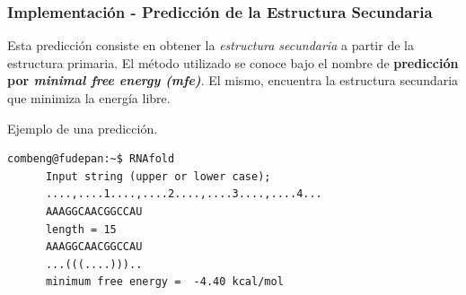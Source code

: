 \documentclass[xcolor=pdftex,dvipsnames,table,10pt,babel,spanish]{beamer}
\begin{document}



\begin {frame}[fragile]
    \frametitle{Implementaci\'on - Predicci\'on de la Estructura Secundaria}
      Esta predicci\'on consiste en obtener la \emph{estructura secundaria} a partir de la estructura primaria. El m\'etodo utilizado se conoce bajo el nombre de \textbf{predicci\'on por \emph{minimal free energy (mfe)}}. El mismo, encuentra la estructura secundaria que minimiza la energ\'ia libre.\\
      \begin{block} {Ejemplo de una predicci\'on.}
      \scriptsize
      \begin{lstlisting}[basicstyle=\tt, frame=trBL, tabsize=4] 
	  combeng@fudepan:~$ RNAfold
	  Input string (upper or lower case); 
	  ....,....1....,....2....,....3....,....4...
	  AAAGGCAACGGCCAU
	  length = 15
	  AAAGGCAACGGCCAU
	  ...(((....)))..
	  minimum free energy =  -4.40 kcal/mol
      \end{lstlisting}
      \end{block}
      \normalsize
\end{frame}
\end{document}

